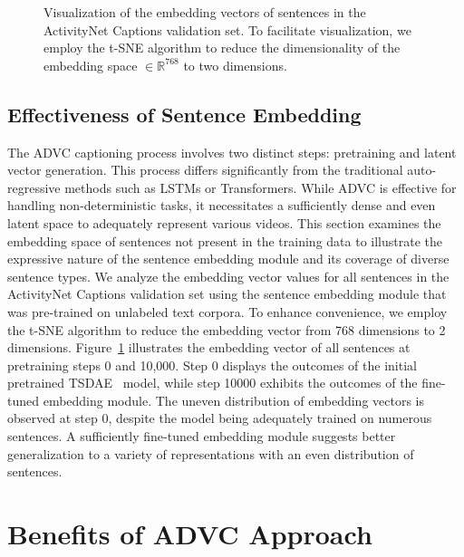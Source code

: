 \begin{figure}
    \centering
    \caption{Visualization of the embedding vectors of sentences in the ActivityNet Captions validation set.
    To facilitate visualization, we employ the t-SNE algorithm to reduce the dimensionality of the embedding space $\in \mathbb{R}^{768}$ to two dimensions.}
    \label{fig:latent_space}
\end{figure}

\subsection{Effectiveness of Sentence Embedding}
The ADVC captioning process involves two distinct steps: pretraining and latent vector generation.
This process differs significantly from the traditional auto-regressive methods such as LSTMs or Transformers.
While ADVC is effective for handling non-deterministic tasks, it necessitates a sufficiently dense and even latent space to adequately represent various videos.
This section examines the embedding space of sentences not present in the training data to illustrate the expressive nature of the sentence embedding module and its coverage of diverse sentence types.
We analyze the embedding vector values for all sentences in the ActivityNet Captions validation set using the sentence embedding module that was pre-trained on unlabeled text corpora.
To enhance convenience, we employ the t-SNE algorithm to reduce the embedding vector from 768 dimensions to 2 dimensions.
Figure~\ref{fig:latent_space} illustrates the embedding vector of all sentences at pretraining steps 0 and 10,000.
Step 0 displays the outcomes of the initial pretrained TSDAE~\cite{Wang2022-um} model, while step 10000 exhibits the outcomes of the fine-tuned embedding module.
The uneven distribution of embedding vectors is observed at step 0, despite the model being adequately trained on numerous sentences.
A sufficiently fine-tuned embedding module suggests better generalization to a variety of representations with an even distribution of sentences.



\section{Benefits of ADVC Approach}
\label{sec:advc_benefits}


